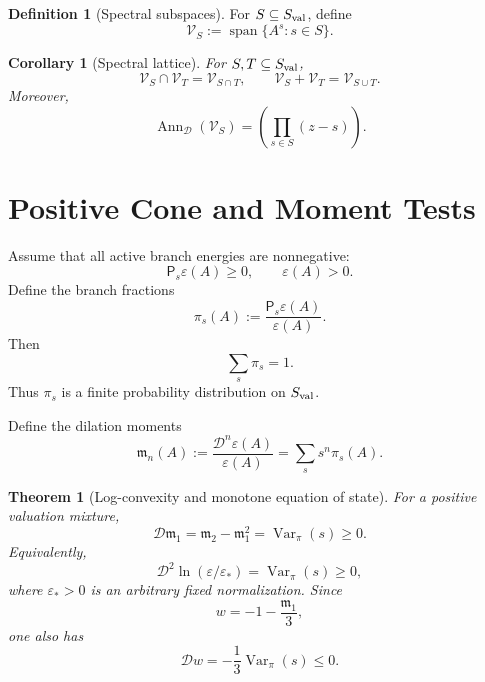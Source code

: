 \documentclass[aps,prd,reprint,onecolumn,nofootinbib,superscriptaddress,showkeys]{revtex4-2}
\numberwithin{equation}{section}
\theoremstyle{definition}
\newtheorem{definition}{Definition}[section]
\theoremstyle{plain}
\newtheorem{theorem}{Theorem}[section]
\newtheorem{corollary}{Corollary}[section]
\newcommand{\Dil}{\mathscr D}
\newcommand{\Ann}{\operatorname{Ann}}
\newcommand{\spanop}{\operatorname{span}}
\begin{document}
\begin{definition}[Spectral subspaces]
For \(S\subseteq S_{\rm val}\), define
\begin{equation}
\mathcal V_S:=\spanop\{A^s:s\in S\}.
\end{equation}
\end{definition}

\begin{corollary}[Spectral lattice]
For \(S,T\subseteq S_{\rm val}\),
\begin{equation}
\mathcal V_S\cap\mathcal V_T=\mathcal V_{S\cap T},
\qquad
\mathcal V_S+\mathcal V_T=\mathcal V_{S\cup T}.
\end{equation}
Moreover,
\begin{equation}
\Ann_{\Dil}(\mathcal V_S)
=
\left(
\prod_{s\in S}(z-s)
\right).
\end{equation}
\end{corollary}

\section{Positive Cone and Moment Tests}

Assume that all active branch energies are nonnegative:
\begin{equation}
\mathsf P_s\varepsilon(A)\ge0,
\qquad
\varepsilon(A)>0.
\end{equation}
Define the branch fractions
\begin{equation}
\pi_s(A):=\frac{\mathsf P_s\varepsilon(A)}{\varepsilon(A)}.
\end{equation}
Then
\begin{equation}
\sum_s\pi_s=1.
\end{equation}
Thus \(\pi_s\) is a finite probability distribution on \(S_{\rm val}\).

Define the dilation moments
\begin{equation}
\mathfrak m_n(A):=
\frac{\Dil^n\varepsilon(A)}{\varepsilon(A)}
=
\sum_s s^n\pi_s(A).
\end{equation}

\begin{theorem}[Log-convexity and monotone equation of state]
For a positive valuation mixture,
\begin{equation}
\Dil\mathfrak m_1
=
\mathfrak m_2-\mathfrak m_1^2
=
\operatorname{Var}_\pi(s)\ge0.
\end{equation}
Equivalently,
\begin{equation}
\boxed{
\Dil^2\ln(\varepsilon/\varepsilon_*)=
\operatorname{Var}_\pi(s)\ge0,
}
\end{equation}
where \(\varepsilon_*>0\) is an arbitrary fixed normalization.  Since
\begin{equation}
w=-1-\frac{\mathfrak m_1}{3},
\end{equation}
one also has
\begin{equation}
\boxed{
\Dil w=-\frac13\operatorname{Var}_\pi(s)\le0.
}
\end{equation}
\end{theorem}
\end{document}
